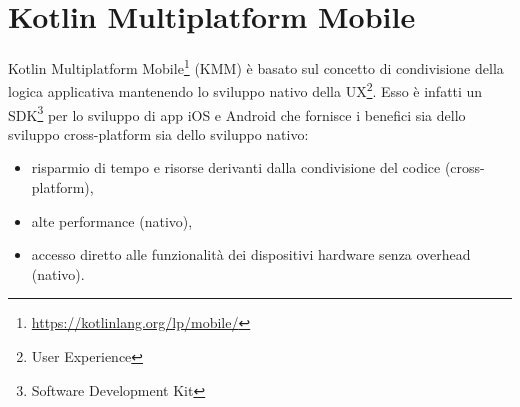 
\section{Kotlin Multiplatform Mobile}
Kotlin Multiplatform Mobile\footnote{\url{https://kotlinlang.org/lp/mobile/}} (KMM) è basato sul concetto di condivisione della logica applicativa mantenendo lo sviluppo nativo della UX\footnote{User Experience}. Esso è infatti un SDK\footnote{Software Development Kit} per lo sviluppo di app iOS e Android che fornisce i benefici sia dello sviluppo cross-platform sia dello sviluppo nativo:
\begin{itemize}
    \item risparmio di tempo e risorse derivanti dalla condivisione del codice (cross-platform),
    \item alte performance (nativo),
    \item accesso diretto alle funzionalità dei dispositivi hardware senza overhead (nativo).
\end{itemize}

